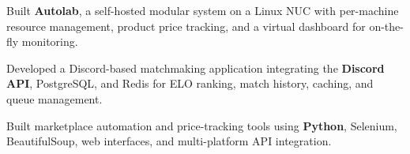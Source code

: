 \begin{cventries}
  \cventry{}{}{}{}
    {\begin{cvitems}
        \item {Built \textbf{Autolab}, a self-hosted modular system on a Linux NUC with per-machine resource management, product price tracking, and a virtual dashboard for on-the-fly monitoring.}
        \item {Developed a Discord-based matchmaking application integrating the \textbf{Discord API}, PostgreSQL, and Redis for ELO ranking, match history, caching, and queue management.}
        \item {Built marketplace automation and price-tracking tools using \textbf{Python}, Selenium, BeautifulSoup, web interfaces, and multi-platform API integration.}
    \end{cvitems}}
    {}
\end{cventries}
